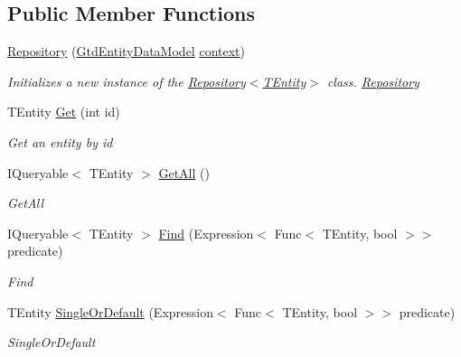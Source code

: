 \subsection*{Public Member Functions}
\begin{DoxyCompactItemize}
\item 
\mbox{\hyperlink{class_gtd_app_1_1_repository_1_1_repository_a7f85fc7e6c3c85b561ac9d31859c9ed5}{Repository}} (\mbox{\hyperlink{class_gtd_app_1_1_data_1_1_gtd_entity_data_model}{Gtd\+Entity\+Data\+Model}} \mbox{\hyperlink{class_gtd_app_1_1_repository_1_1_repository_a693057a1b8acd4c3778c183440feed41}{context}})
\begin{DoxyCompactList}\small\item\em Initializes a new instance of the \mbox{\hyperlink{class_gtd_app_1_1_repository_1_1_repository_a7f85fc7e6c3c85b561ac9d31859c9ed5}{Repository$<$\+T\+Entity$>$}} class. \mbox{\hyperlink{class_gtd_app_1_1_repository_1_1_repository}{Repository}} \end{DoxyCompactList}\item 
T\+Entity \mbox{\hyperlink{class_gtd_app_1_1_repository_1_1_repository_a95123d874c390a6707a12d17fd9b274b}{Get}} (int id)
\begin{DoxyCompactList}\small\item\em Get an entity by id \end{DoxyCompactList}\item 
I\+Queryable$<$ T\+Entity $>$ \mbox{\hyperlink{class_gtd_app_1_1_repository_1_1_repository_a63de411b4f50ec975c4a9db03ec36143}{Get\+All}} ()
\begin{DoxyCompactList}\small\item\em Get\+All \end{DoxyCompactList}\item 
I\+Queryable$<$ T\+Entity $>$ \mbox{\hyperlink{class_gtd_app_1_1_repository_1_1_repository_a4116e83efd4b289ba315be6e68e81eb4}{Find}} (Expression$<$ Func$<$ T\+Entity, bool $>$$>$ predicate)
\begin{DoxyCompactList}\small\item\em Find \end{DoxyCompactList}\item 
T\+Entity \mbox{\hyperlink{class_gtd_app_1_1_repository_1_1_repository_a5e3d1bdfdf567227d337af334954cf45}{Single\+Or\+Default}} (Expression$<$ Func$<$ T\+Entity, bool $>$$>$ predicate)
\begin{DoxyCompactList}\small\item\em Single\+Or\+Default \end{DoxyCompactList}\item 

\end{DoxyCompactItemize}
